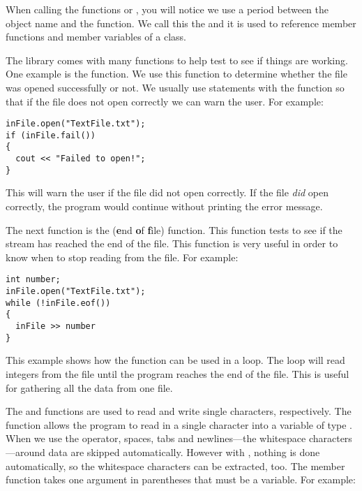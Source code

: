 When calling the functions  or , you will notice we use a period between the object name and the function. 
We call this the  and it is used to reference member functions and member variables of a class. 


The  library comes with many functions to help test to see if things are working. 
One example is the  function. 
We use this function to determine whether the file was opened successfully or not. 
We usually use  statements with the function so that if the file does not open correctly we can warn the user. 
For example:

\noindent\begin{minipage}{\linewidth}\begin{lstlisting}
inFile.open("TextFile.txt");
if (inFile.fail())
{ 
  cout << "Failed to open!";
}
\end{lstlisting}\end{minipage}

This will warn the user if the file did not open correctly. 
If the file \emph{did} open correctly, the program would continue without printing the error message.

The next function is the  (\textbf{e}nd \textbf{o}f \textbf{f}ile) function. 
This function tests to see if the stream has reached the end of the file. 
This function is very useful in order to know when to stop reading from the file. 
For example:

\noindent\begin{minipage}{\linewidth}\begin{lstlisting}
int number;
inFile.open("TextFile.txt");
while (!inFile.eof())
{
  inFile >> number
}
\end{lstlisting}\end{minipage}

This example shows how the  function can be used in a  loop. 
The  loop will read integers from the file until the program reaches the end of the file. 
This is useful for gathering all the data from one file. 

The  and  functions are used to read and write single characters, respectively. 
The function  allows the program to read in a single character into a variable of type . 
When we use the \Code{>>} operator, spaces, tabs and newlines---the whitespace characters---around data are skipped automatically. 
However with , nothing is done automatically, so the whitespace characters can be extracted, too. 
The member function  takes one argument in parentheses that must be a  variable. 
For example:

